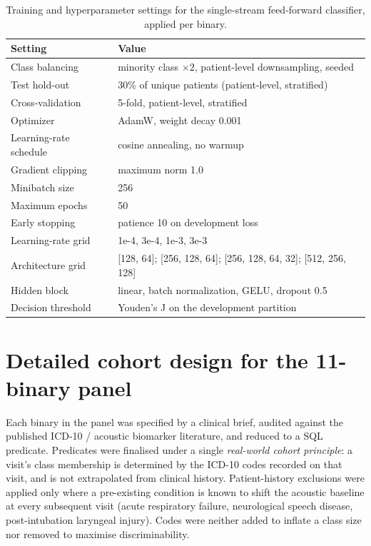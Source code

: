 \documentclass[utf8]{frontiers_suppmat} %
\begin{document}
\begin{table}[t]
\centering
\caption{Training and hyperparameter settings for the single-stream feed-forward classifier, applied per binary.}
\label{tab:supp-hyperparameters}
\footnotesize
\setlength{\tabcolsep}{6pt}
\renewcommand{\arraystretch}{1.2}
\begin{tabular}{@{}l l@{}}
\toprule
Setting & Value \\
\midrule
Class balancing & minority class $\times 2$, patient-level downsampling, seeded \\
Test hold-out & 30\% of unique patients (patient-level, stratified) \\
Cross-validation & 5-fold, patient-level, stratified \\
Optimizer & AdamW, weight decay 0.001 \\
Learning-rate schedule & cosine annealing, no warmup \\
Gradient clipping & maximum norm 1.0 \\
Minibatch size & 256 \\
Maximum epochs & 50 \\
Early stopping & patience 10 on development loss \\
Learning-rate grid & 1e-4, 3e-4, 1e-3, 3e-3 \\
Architecture grid & [128, 64]; [256, 128, 64]; [256, 128, 64, 32]; [512, 256, 128] \\
Hidden block & linear, batch normalization, GELU, dropout 0.5 \\
Decision threshold & Youden's J on the development partition \\
\bottomrule
\end{tabular}
\end{table}



\section{Detailed cohort design for the 11-binary panel}
\label{sec:supp-cohort-design}

Each binary in the panel was specified by a clinical brief, audited
against the published ICD-10 / acoustic biomarker literature, and
reduced to a SQL predicate. Predicates were finalised under a single
\emph{real-world cohort principle}: a visit's class membership is
determined by the ICD-10 codes recorded on that visit, and is not
extrapolated from clinical history. Patient-history exclusions were
applied only where a pre-existing condition is known to shift the
acoustic baseline at every subsequent visit (acute respiratory
failure, neurological speech disease, post-intubation laryngeal
injury). Codes were neither added to inflate a class size nor removed
to maximise discriminability.
\end{document}
